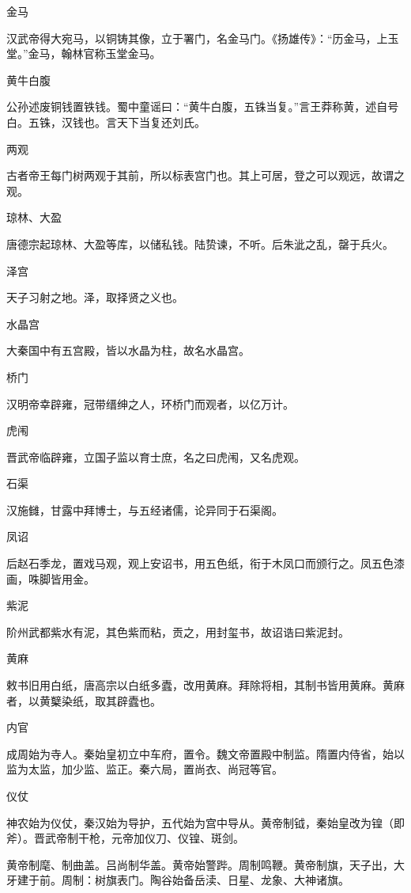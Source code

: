 \documentclass[a4paper,12pt,UTF8,twoside]{ctexbook}
\begin{document}
    金马
    
    汉武帝得大宛马，以铜铸其像，立于署门，名金马门。《扬雄传》：“历金马，上玉堂。”金马，翰林官称玉堂金马。
    
    黄牛白腹
    
    公孙述废铜钱置铁钱。蜀中童谣曰：“黄牛白腹，五铢当复。”言王莽称黄，述自号白。五铢，汉钱也。言天下当复还刘氏。
    
    两观
    
    古者帝王每门树两观于其前，所以标表宫门也。其上可居，登之可以观远，故谓之观。
    
    琼林、大盈
    
    唐德宗起琼林、大盈等库，以储私钱。陆贽谏，不听。后朱泚之乱，罄于兵火。
    
    泽宫
    
    天子习射之地。泽，取择贤之义也。
    
    水晶宫
    
    大秦国中有五宫殿，皆以水晶为柱，故名水晶宫。
    
    桥门
    
    汉明帝幸辟雍，冠带缙绅之人，环桥门而观者，以亿万计。
    
    虎闱
    
    晋武帝临辟雍，立国子监以育士庶，名之曰虎闱，又名虎观。
    
    石渠
    
    汉施雠，甘露中拜博士，与五经诸儒，论异同于石渠阁。
    
    凤诏
    
    后赵石季龙，置戏马观，观上安诏书，用五色纸，衔于木凤口而颁行之。凤五色漆画，咮脚皆用金。
    
    紫泥
    
    阶州武都紫水有泥，其色紫而粘，贡之，用封玺书，故诏诰曰紫泥封。
    
    黄麻
    
    敕书旧用白纸，唐高宗以白纸多蠹，改用黄麻。拜除将相，其制书皆用黄麻。黄麻者，以黄櫱染纸，取其辟蠹也。
    
    内官
    
    成周始为寺人。秦始皇初立中车府，置令。魏文帝置殿中制监。隋置内侍省，始以监为太监，加少监、监正。秦六局，置尚衣、尚冠等官。
    
    仪仗
    
    神农始为仪仗，秦汉始为导护，五代始为宫中导从。黄帝制钺，秦始皇改为锽（即斧）。晋武帝制干枪，元帝加仪刀、仪锽、斑剑。
    
    黄帝制麾、制曲盖。吕尚制华盖。黄帝始警跸。周制鸣鞭。黄帝制旗，天子出，大牙建于前。周制：树旗表门。陶谷始备岳渎、日星、龙象、大神诸旗。
    
\end{document}
